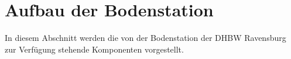 
\clearpage
\section{Aufbau der Bodenstation}
\label{chap:bodenstation}
In diesem Abschnitt werden die von der Bodenstation der DHBW Ravensburg zur Verfügung stehende Komponenten vorgestellt.
